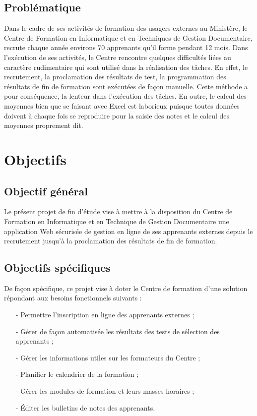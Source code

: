 \subsection{Problématique}
Dans le cadre de ses activités de formation des usagers externes au Ministère, le Centre de Formation en Informatique et en Techniques de Gestion Documentaire, recrute chaque année environs 70 apprenants qu'il forme pendant 12 mois. Dans l'exécution de ses activités, le Centre rencontre quelques difficultés liées au caractère rudimentaire qui sont utilisé dans la réalisation des tâches. En effet, le recrutement, la proclamation des résultats de test, la programmation des résultats de fin de formation sont exécutées de façon manuelle. Cette méthode a pour conséquence, la lenteur dans l'exécution des tâches. En outre, le calcul des moyennes bien que se faisant avec Excel est laborieux puisque toutes données doivent à chaque fois se reproduire pour la saisie des notes et le calcul des moyennes proprement dit. 
\section{Objectifs}
\subsection{Objectif général}
Le présent projet de fin d'étude vise à mettre à la disposition du Centre de Formation en Informatique et en Technique de Gestion Documentaire une application Web sécurisée de gestion en ligne de ses apprenants externes depuis le recrutement jusqu'à la proclamation des résultats de fin de formation.
\subsection{Objectifs spécifiques}
De façon spécifique, ce projet vise à doter le Centre de formation d'une solution répondant aux besoins fonctionnels suivants :
\begin{itemize}
	\item[-]Permettre l'inscription en ligne des apprenants externes 	;
	\item[-]Gérer de façon automatisée les résultats des tests de sélection des apprenants ;
	\item[-]Gérer les informations utiles sur les formateurs du Centre ;
	\item[-]Planifier le calendrier de la formation ;
	\item[-]Gérer les modules de formation et leurs masses horaires ;
	\item[-]Éditer les bulletins de notes des apprenants.
\end{itemize}




